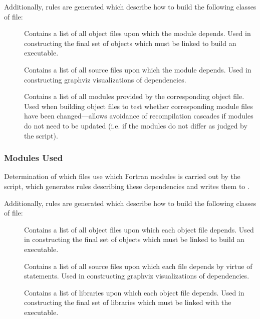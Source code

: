 Additionally, rules are generated which describe how to build the following classes of file:
\begin{description}
\item[] Contains a list of all object files upon which the module depends. Used in constructing the final set of objects which must be linked to build an executable.
\item[] Contains a list of all source files upon which the module depends. Used in constructing \gls{graphviz} visualizations of dependencies.
\item[] Contains a list of all modules provided by the corresponding object file. Used when building object files to test whether corresponding module files have been changed---allows avoidance of recompilation cascades if modules do not need to be updated (i.e. if the modules do not differ as judged by the  script).
\end{description}

\subsubsection{Modules Used}\label{sec:buildModulesUsed}

Determination of which files use which Fortran modules is carried out by the  script, which generates rules describing these dependencies and writes them to .

Additionally, rules are generated which describe how to build the following classes of file:
\begin{description}
\item[] Contains a list of all object files upon which each object file depends. Used in constructing the final set of objects which must be linked to build an executable.
\item[] Contains a list of all source files upon which each file depends by virtue of  statements. Used in constructing \gls{graphviz} visualizations of dependencies.
\item[] Contains a list of libraries upon which each object file depends. Used in constructing the final set of libraries which must be linked with the executable.
\end{description}

